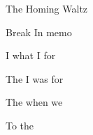 \begin{SBSong}{The Homing Waltz}
\begin{SBBracket}{Break}
	In  memo
  \end{SBBracket}
  \begin{SBVerse}
	I  what I  for
	
	The  I was  for
	
	The  when we 
	
	To the   
  \end{SBVerse}
\end{SBSong}